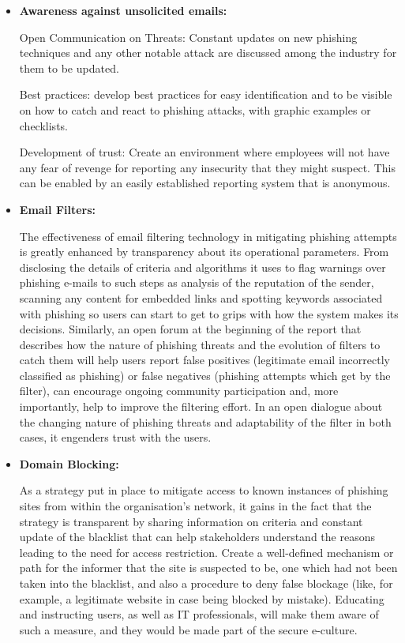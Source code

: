 \begin{itemize}
     \item \textbf{Awareness against unsolicited emails:  } 
     
     Open Communication on Threats: Constant updates on new phishing techniques and any other notable attack are discussed among the industry for them to be updated.
     
Best practices: develop best practices for easy identification and to be visible on how to catch and react to phishing attacks, with graphic examples or checklists.

Development of trust: Create an environment where employees will not have any fear of revenge for reporting any insecurity that they might suspect. This can be enabled by an easily established reporting system that is anonymous.

\item \textbf{Email Filters:} 

The effectiveness of email filtering technology in mitigating phishing attempts is greatly enhanced by transparency about its operational parameters. From disclosing the details of criteria and algorithms it uses to flag warnings over phishing e-mails to such steps as analysis of the reputation of the sender, scanning any content for embedded links and spotting keywords associated with phishing so users can start to get to grips with how the system makes its decisions. Similarly, an open forum at the beginning of the report that describes how the nature of phishing threats and the evolution of filters to catch them will help users report false positives (legitimate email incorrectly classified as phishing) or false negatives (phishing attempts which get by the filter), can encourage ongoing community participation and, more importantly, help to improve the filtering effort. In an open dialogue about the changing nature of phishing threats and adaptability of the filter in both cases, it engenders trust with the users.

\item \textbf{Domain Blocking:} 

As a strategy put in place to mitigate access to known instances of phishing sites from within the organisation's network, it gains in the fact that the strategy is transparent by sharing information on criteria and constant update of the blacklist that can help stakeholders understand the reasons leading to the need for access restriction. Create a well-defined mechanism or path for the informer that the site is suspected to be, one which had not been taken into the blacklist, and also a procedure to deny false blockage (like, for example, a legitimate website in case being blocked by mistake). Educating and instructing users, as well as IT professionals, will make them aware of such a measure, and they would be made part of the secure e-culture.


\end{itemize}
